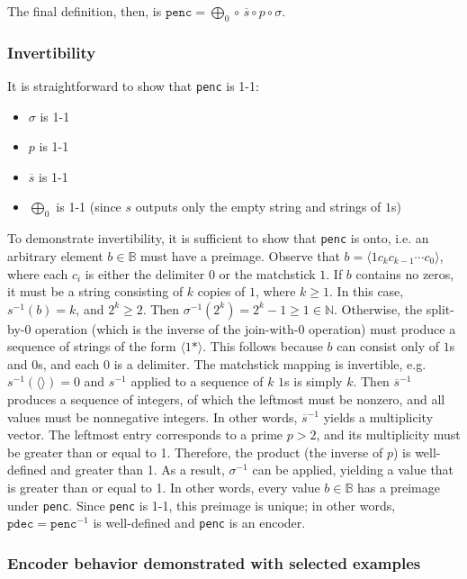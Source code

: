 \documentclass[12pt,reqno]{article}
\begin{document}
The final definition, then, is $\texttt{penc} = \bigoplus_0 \circ \, \overline{s} \circ p \circ \sigma$.

\subsubsection{Invertibility}

It is straightforward to show that \texttt{penc} is 1-1: \begin{itemize}
  \item $\sigma$ is 1-1
  \item $p$ is 1-1
  \item $\overline{s}$ is 1-1
  \item $\bigoplus_0$ is 1-1 (since $s$ outputs only the empty string and strings of $1$s)
\end{itemize}


To demonstrate invertibility, it is sufficient to show that \texttt{penc} is onto, i.e. an arbitrary element $b \in \mathbb{B}$ must have a preimage. Observe that $b = \langle 1 c_{k} c_{k-1} \cdots c_0 \rangle$, where each $c_i$ is either the delimiter $0$ or the matchstick $1$. If $b$ contains no zeros, it must be a string consisting of $k$ copies of $1$, where $k \geq 1$. In this case, $s^{-1}(b) = k$, and $2^k \geq 2$. Then $\sigma^{-1}(2^k) = 2^k - 1 \geq 1\in \mathbb{N}$. Otherwise, the split-by-$0$ operation (which is the inverse of the join-with-$0$ operation) must produce a sequence of strings of the form $\langle 1* \rangle$. This follows because $b$ can consist only of $1$s and $0$s, and each $0$ is a delimiter. The matchstick mapping is invertible, e.g. $s^{-1}(\langle \rangle) = 0$ and $s^{-1}$ applied to a sequence of $k$ $1$s is simply $k$. Then $\overline{s}^{-1}$ produces a sequence of integers, of which the leftmost must be nonzero, and all values must be nonnegative integers. In other words, $\overline{s}^{-1}$ yields a multiplicity vector. The leftmost entry corresponds to a prime $p > 2$, and its multiplicity must be greater than or equal to 1. Therefore, the product (the inverse of $p$) is well-defined and greater than 1. As a result, $\sigma^{-1}$ can be applied, yielding a value that is greater than or equal to 1. In other words, every value $b \in \mathbb{B}$ has a preimage under \texttt{penc}. Since \texttt{penc} is 1-1, this preimage is unique; in other words, $\texttt{pdec} = \texttt{penc}^{-1}$ is well-defined and \texttt{penc} is an encoder.

\subsubsection{Encoder behavior demonstrated with selected examples}
\end{document}
